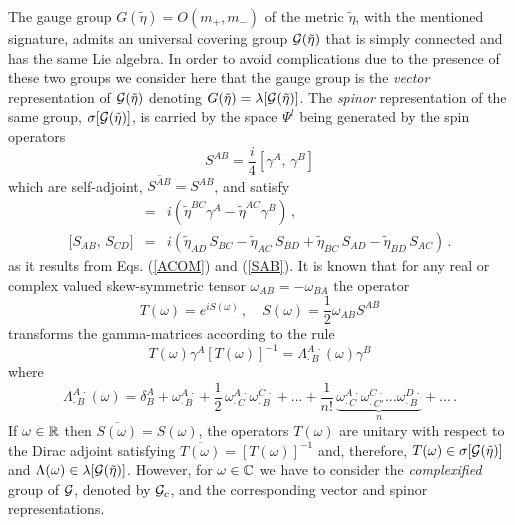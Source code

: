 \documentclass[a4paper,12pt]{article}
\begin{document}
The gauge group $G(\tilde\eta)=O( m_{+}, m_{-})$ of the metric $\tilde\eta$, 
with the mentioned signature, admits an universal covering group 
${\cal G}(\tilde \eta)$ that is 
simply connected and has the same Lie algebra. In order to avoid complications 
due to the presence of these two groups we consider here that the gauge group 
is the {\em vector} representation of   ${\cal G}(\tilde \eta)$ denoting 
$G(\tilde \eta)=\lambda[{\cal G}(\tilde \eta)]$. The {\em spinor} 
representation of the same group,  $\sigma[{\cal G}(\tilde\eta)]$,  
is carried by the space $\Psi^l$ being generated by the spin operators
\begin{equation}\label{SAB} 
S^{AB}=\frac{i}{4}\left[\gamma^{A},\,\gamma^{B}
\right]
\end{equation}
which are self-adjoint, $\overline{S^{AB}} =S^{AB}$,  and satisfy
\begin{eqnarray}
[S^{AB},\,\gamma^{C}]&=&
i(\tilde\eta^{BC}\gamma^{A}-
\tilde\eta^{AC}\gamma^{B})\,,\label{Sgg}\\
{[} S_{AB},\,S_{CD} {]}&=&i(
\tilde\eta_{AD}\,S_{BC}-
\tilde\eta_{AC}\,S_{BD}+
\tilde\eta_{BC}\,S_{AD}-
\tilde\eta_{BD}\,S_{AC})\,.\label{SSS}
\end{eqnarray}
as it results from Eqs. (\ref{ACOM}) and (\ref{SAB}). It is known that for any 
real or complex valued skew-symmetric tensor $\omega_{AB}=-\omega_{BA}$ 
the operator 
\begin{equation}\label{TeS}
T(\omega)=e^{iS(\omega)}\,,\quad S(\omega)=\frac{1}{2}
\omega_{AB} S^{AB}
\end{equation}
transforms the gamma-matrices according to the rule
\begin{equation}\label{TgT}
T(\omega)\gamma^{A}[T(\omega)]^{-1}=\Lambda^{A\,\cdot}
_{\cdot\,B}(\omega)\gamma^{B} 
\end{equation}
where
\begin{equation}\label{Lam}
\Lambda^{A\,\cdot}_{\cdot\,B}(\omega)=
\delta^{A}_{B}
+\omega^{A\,\cdot}_{\cdot\,B}
+\frac{1}{2}\,\omega^{A\,\cdot}_{\cdot\,C}
\omega^{C\,\cdot}_{\cdot\,B}+...
+\frac{1}{n!}\,\underbrace{\omega^{A\,\cdot}_{\cdot\,C}
\omega^{C\,\cdot}_{\cdot\, C'}
...\omega^{D\,\cdot}_{\cdot\,B}}_{n}+...\,.
\end{equation}
If $\omega\in {\Bbb R}$ then $\overline{S(\omega)}=S(\omega)$,  the 
operators $T(\omega)$ are unitary with respect to the Dirac adjoint 
satisfying $\overline{T(\omega)}=[T(\omega)]^{-1}$ and, therefore, $T(\omega)
\in \sigma[{\cal G}(\tilde\eta)]$
and $\Lambda(\omega)\in \lambda[{\cal G}(\tilde\eta)]$. However, 
for $\omega \in {\Bbb C}$ we have to consider the {\em complexified}  
group of ${\cal G}$, denoted by ${\cal G}_c$, and the corresponding vector 
and spinor representations.     
\end{document}
